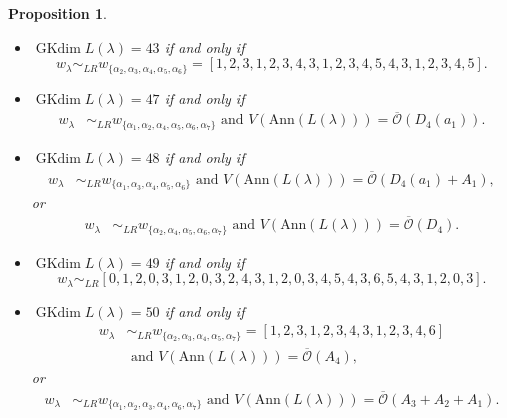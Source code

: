 \documentclass[reqno,12pt]{amsart}
\numberwithin{equation}{section}
\theoremstyle{plain}
\newtheorem{Prop}[Thm]{Proposition}
\theoremstyle{definition}
\newcommand{\lam}{\lambda}
\newcommand{\Ann}{\mathrm{Ann}}
\newcommand{\gkd}{\operatorname{GKdim}}
\begin{document}
\begin{Prop}
\begin{itemize}
        \item[(11)] $\gkd L(\lambda)=43$ if and only if $$w_{\lambda}\sim_{LR}w_{\{\alpha_2,\alpha_3,\alpha_4,\alpha_5,\alpha_6\}}=[1,2,3,1,2,3,4,3,1,2,3,4,5,4,3,1,2,3,4,5].$$
    \item[(12)] $\gkd L(\lambda)=47$ if and only if \begin{align*}
          w_{\lambda}&\sim_{LR}w_{\{\alpha_1,\alpha_2,\alpha_4,\alpha_5,\alpha_6,\alpha_7\}} \text{~and~} V(\Ann (L(\lam)))=\overline{\mathcal{O}}({D}_4(a_1)).
      \end{align*}
        \item[(13)] $\gkd L(\lambda)=48$ if and only if \begin{align*}w_{\lambda}&\sim_{LR}w_{\{\alpha_1,\alpha_3,\alpha_4,\alpha_5,\alpha_6\}}\text{~and~} V(\Ann (L(\lam)))=\overline{\mathcal{O}}({D}_4(a_1)+A_1),
\end{align*}
        or
        \begin{align*}w_{\lambda}&\sim_{LR}w_{\{\alpha_2,\alpha_4,\alpha_5,\alpha_6,\alpha_7\}}\text{~and~} V(\Ann (L(\lam)))=\overline{\mathcal{O}}({D}_4).
            \end{align*}
   
      \item[(14)] $\gkd L(\lambda)=49$ if and only if 
     $$w_{\lambda}\sim_{LR} [0, 1, 2, 0, 3, 1, 2, 0, 3, 2, 4, 3, 1, 2, 0, 3, 4, 5, 4, 3, 6, 5, 4, 3, 1, 2, 0, 3].$$
         \item[(15)] $\gkd L(\lambda)=50$ if and only if \begin{align*}
w_{\lambda}&\sim_{LR}w_{\{\alpha_2,\alpha_3,\alpha_4,\alpha_5,\alpha_7\}}=[1,2,3,1,2,3,4,3,1,2,3,4,6]\\
&\text{~and~} V(\Ann (L(\lam)))=\overline{\mathcal{O}}({A}_4),
         \end{align*}
        or
\begin{align*}
w_{\lambda}&\sim_{LR}w_{\{\alpha_1,\alpha_2,\alpha_3,\alpha_4,\alpha_6,\alpha_7\}} \text{~and~} V(\Ann (L(\lam)))=\overline{\mathcal{O}}(A_3+A_2+A_1).
         \end{align*}
        

\end{itemize}
\end{Prop}
\end{document}
